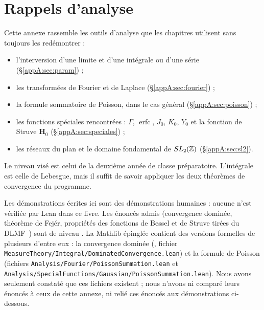 \chapter{Rappels d'analyse}\label{appA:chap}

Cette annexe rassemble les outils d'analyse que les chapitres utilisent sans toujours les redémontrer :
\begin{itemize}
\item l'interversion d'une limite et d'une intégrale ou d'une série (§\ref{appA:sec:param}) ;
\item les transformées de Fourier et de Laplace (§\ref{appA:sec:fourier}) ;
\item la formule sommatoire de Poisson, dans le cas général (§\ref{appA:sec:poisson}) ;
\item les fonctions spéciales rencontrées : $\Gamma$, $\operatorname{erfc}$, $J_0$, $K_0$, $Y_0$ et la fonction de
Struve $\mathbf H_0$ (§\ref{appA:sec:speciales}) ;
\item les réseaux du plan et le domaine fondamental de $SL_2(\mathbb{Z})$ (§\ref{appA:sec:sl2}).
\end{itemize}
Le niveau visé est celui de la deuxième année de classe préparatoire. L'intégrale est celle de Lebesgue, mais il suffit
de savoir appliquer les deux théorèmes de convergence du programme.

\begin{warnbox}
Les démonstrations écrites ici sont des démonstrations humaines \tierC{} : aucune n'est vérifiée par Lean dans ce livre.
Les énoncés admis (convergence dominée, théorème de Fejér, propriétés des fonctions de Bessel et de Struve tirées du
DLMF~\cite{app:dlmf}) sont de niveau \tierL. La Mathlib épinglée contient des versions formelles de plusieurs d'entre
eux : la convergence dominée (, fichier
\texttt{MeasureTheory/Integral/DominatedConvergence.lean}) et la formule de Poisson (fichiers
\texttt{Analysis/Fourier/PoissonSummation.lean} et \texttt{Analysis/SpecialFunctions/Gaussian/PoissonSummation.lean}).
Nous avons seulement constaté que ces fichiers existent ; nous n'avons ni comparé leurs énoncés à ceux de cette annexe,
ni relié ces énoncés aux démonstrations ci-dessous.
\end{warnbox}

